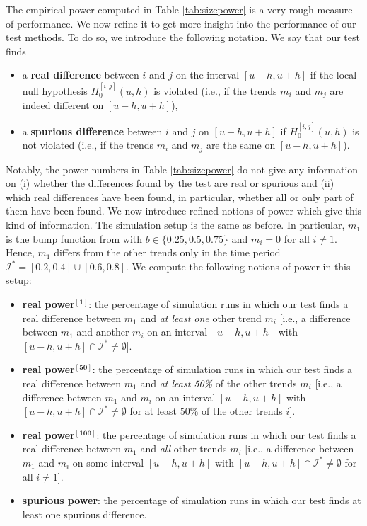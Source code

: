 \documentclass[12pt]{article}
\makeatletter
\renewcommand{\eqref}[1]{\tagform@{\ref{#1}}}
\makeatother
\begin{document}
The empirical power computed in Table \ref{tab:sizepower} is a very rough measure of performance. We now refine it to get more insight into the performance of our test methods. To do so, we introduce the following notation. We say that our test finds
\begin{itemize}[itemsep=0pt, parsep=0pt, topsep=3pt]
\item a \textbf{real difference} between $i$ and $j$ on the interval $[u-h,u+h]$ if the local null hypothesis $H_0^{[i,j]}(u,h)$ is violated (i.e., if the trends $m_i$ and $m_j$ are indeed different on $[u-h,u+h]$),
\item a \textbf{spurious difference} between $i$ and $j$ on $[u-h,u+h]$ if $H_0^{[i,j]}(u,h)$ is not violated (i.e., if the trends $m_i$ and $m_j$ are the same on $[u-h,u+h]$). 
\end{itemize}
Notably, the power numbers in Table \ref{tab:sizepower} do not give any information on
(i) whether the differences found by the test are real or spurious and
(ii) which real differences have been found, in particular, whether all or only part of them have been found.
We now introduce refined notions of power which give this kind of information. The simulation setup is the same as before. In particular, $m_1$ is the bump function from \eqref{eq:bump-fct} with $b \in \{0.25,0.5,0.75\}$ and $m_i = 0$ for all $i \ne 1$. Hence, $m_1$ differs from the other trends only in the time period $\mathcal{I}^* = [0.2, 0.4] \cup [0.6, 0.8]$. We compute the following notions of power in this setup: 
\begin{itemize}[itemsep=0pt, parsep=0pt, topsep=3pt]
\item \textbf{real power$^{\boldsymbol{[1]}}$}: the percentage of simulation runs in which our test finds a real difference between $m_1$ and \textit{at least one} other trend $m_i$ [i.e., a difference between $m_1$ and another $m_i$ on an interval $[u-h, u+h]$ with $[u-h, u+h] \cap \mathcal{I}^* \neq \emptyset$]. 
\item \textbf{real power$^{\boldsymbol{[50]}}$}: the percentage of simulation runs in which our test finds a real difference between $m_1$ and \textit{at least 50\%} of the other trends $m_i$ [i.e., a difference between $m_1$ and $m_i$ on an interval $[u-h, u+h]$ with $[u-h, u+h] \cap \mathcal{I}^* \neq \emptyset$ for at least $50\%$ of the other trends $i$]. 
\item \textbf{real power$^{\boldsymbol{[100]}}$}: the percentage of simulation runs in which our test finds a real difference between $m_1$ and \textit{all} other trends $m_i$ [i.e., a difference between $m_1$ and $m_i$ on some interval $[u-h, u+h]$ with $[u-h, u+h] \cap \mathcal{I}^* \neq \emptyset$ for all $i \ne 1$]. 
\item \textbf{spurious power}: the percentage of simulation runs in which our test finds at least one spurious difference.  
\end{itemize}
\end{document}
